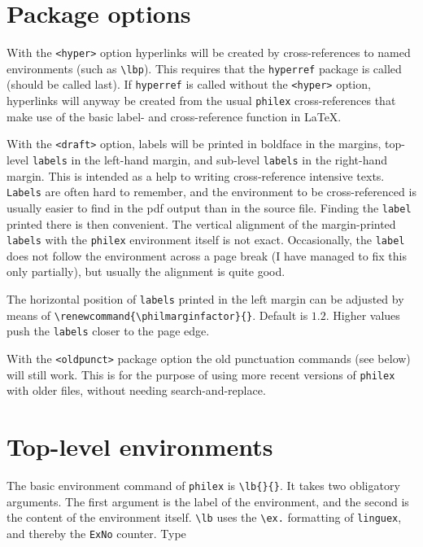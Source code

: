 \documentclass[11pt]{article}
\begin{document}
\section{Package options}
With  the \verb+<hyper>+ option hyperlinks will be created by cross-references to named environments (such as \verb+\lbp+). This requires that the \verb+hyperref+ package is called (should be called last). If \verb+hyperref+ is called without the \verb+<hyper>+ option, hyperlinks will anyway be created from the usual \verb+philex+ cross-references that make use of the basic label- and cross-reference function in LaTeX.

With the \verb+<draft>+ option, labels  will be printed in boldface in the margins, top-level \verb+labels+ in the left-hand margin, and sub-level \verb+labels+ in the right-hand margin. This is intended as a help to writing cross-reference intensive texts. \verb+Labels+ are often hard to remember, and the environment to be cross-referenced is usually easier to find in the pdf output than in the source file. Finding the \verb+label+ printed there is then convenient. The vertical alignment of the margin-printed \verb+labels+ with the \verb+philex+ environment itself is not exact. Occasionally, the \verb+label+ does not follow the environment across a page break (I have managed to fix this only partially), but usually the alignment is quite good.

The horizontal position of \verb+labels+ printed in the left margin can be adjusted by means of \verb+\renewcommand{\philmarginfactor}{}+. Default is \(1.2\). Higher values push the \verb+labels+ closer to the page edge.

With the \verb+<oldpunct>+ package  option  the old punctuation commands (see below) will still work. This is for the purpose of using more recent versions of \verb+philex+ with older files, without needing search-and-replace.

\section{Top-level environments}
The basic environment command of \verb+philex+ is  \verb+\lb{}{}+. It takes two obligatory arguments. The first argument is the label of the environment, and the second is the content of the environment itself. \verb+\lb+ uses the \verb+\ex.+ formatting of \verb+linguex+, and thereby the \verb+ExNo+ counter. Type 
\end{document}
